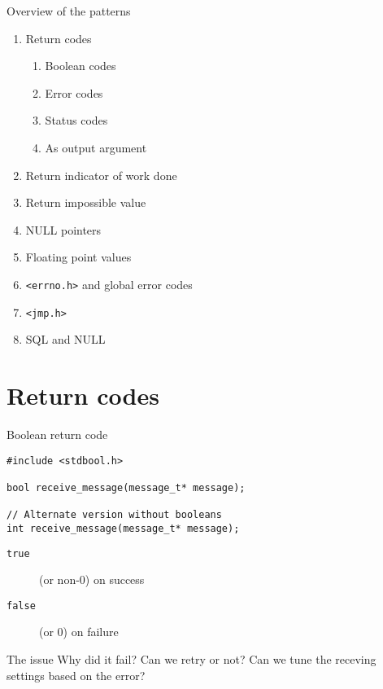 \documentclass[aspectratio=169,14pt]{beamer}
\begin{document}
\begin{frame}{Overview of the patterns}
    \begin{enumerate}
        \item Return codes
            \begin{enumerate}
                \item Boolean codes
                \item Error codes
                \item Status codes
                \item As output argument
            \end{enumerate}
        \item Return indicator of work done
        \item Return impossible value
        \item NULL pointers
        \item Floating point values
        \item \texttt{<errno.h>} and global error codes
        \item \texttt{<jmp.h>}
        \item SQL and NULL
    \end{enumerate}
\end{frame}


\section{Return codes}

\begin{frame}[fragile]{Boolean return code}
\begin{lstlisting}[style=cstyle]
#include <stdbool.h>

bool receive_message(message_t* message);

// Alternate version without booleans
int receive_message(message_t* message);
\end{lstlisting}

    \begin{description}
        \item[\texttt{true}] (or non-0) on success
        \item[\texttt{false}] (or 0) on failure
    \end{description}
    
    \begin{block}{The issue}
        Why did it fail? Can we retry or not? Can we tune the receving settings based on the error?
    \end{block}
\end{frame}
\end{document}
